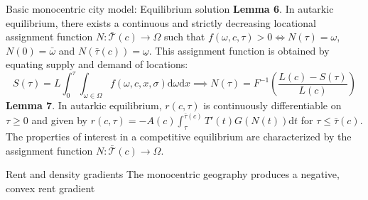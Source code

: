 \documentclass[11pt,notes=hide,aspectratio=169]{beamer}
\begin{document}
\begin{frame}{Basic monocentric city model: Equilibrium solution}
\textbf{Lemma 6}.
In autarkic equilibrium,
there exists a continuous and strictly decreasing locational assignment
function $N:\bar{\mathcal{T}}(c)\to\Omega$ such that $f(\omega,c,\tau)>0\iff N(\tau)=\omega$,
$N(0)=\bar{\omega}$ and $N(\bar{\tau}(c))=\underline{\omega}$.
This assignment function is obtained by equating supply and demand
of locations: 
\begin{equation*}
S(\tau) 
=
L\int_{0}^{\tau}\int_{\omega\in\Omega}f(\omega,c,x,\sigma)\textrm{d}\omega\textrm{d} x
\implies
N(\tau) 
=
F^{-1}\left(\frac{L(c)-S(\tau)}{L(c)}\right)
\end{equation*}
\textbf{Lemma 7}.
In autarkic equilibrium, $r(c,\tau)$
is continuously differentiable on $\tau\geq0$ and given by \textup{$r(c,\tau)=-A(c)\int_{\tau}^{\bar{\tau}(c)}T'(t)G(N(t))\textrm{d} t$
for $\tau\leq\bar{\tau}(c)$.}
The properties of interest in a competitive equilibrium are characterized
by the assignment function $N:\bar{\mathcal{T}}(c)\to\Omega$.
\end{frame}
\begin{frame}{Rent and density gradients}
The monocentric geography produces a negative, convex rent gradient
\end{frame}
\end{document}
